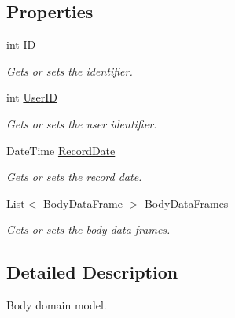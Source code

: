 \subsection*{Properties}
\begin{DoxyCompactItemize}
\item 
int \mbox{\hyperlink{class_bar_none_1_1_shared_1_1_domain_model_1_1_body_data_a03a3f195d85c2beb605779eb1116be4c}{ID}}
\begin{DoxyCompactList}\small\item\em Gets or sets the identifier. \end{DoxyCompactList}\item 
int \mbox{\hyperlink{class_bar_none_1_1_shared_1_1_domain_model_1_1_body_data_a79d6269ab2fcfa088baf547970244db3}{User\+ID}}
\begin{DoxyCompactList}\small\item\em Gets or sets the user identifier. \end{DoxyCompactList}\item 
Date\+Time \mbox{\hyperlink{class_bar_none_1_1_shared_1_1_domain_model_1_1_body_data_a9bbcd2059aaab32725f3534a91b383fa}{Record\+Date}}
\begin{DoxyCompactList}\small\item\em Gets or sets the record date. \end{DoxyCompactList}\item 
List$<$ \mbox{\hyperlink{class_bar_none_1_1_shared_1_1_domain_model_1_1_body_data_frame}{Body\+Data\+Frame}} $>$ \mbox{\hyperlink{class_bar_none_1_1_shared_1_1_domain_model_1_1_body_data_a0d217255f009d5304a1f59fb86202df8}{Body\+Data\+Frames}}
\begin{DoxyCompactList}\small\item\em Gets or sets the body data frames. \end{DoxyCompactList}\end{DoxyCompactItemize}


\subsection{Detailed Description}
Body domain model. 

